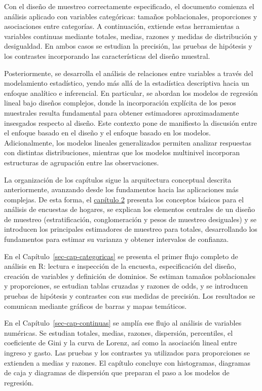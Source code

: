 \documentclass[
  spanish,
  11pt,
  letterpaper,
  oneside,
  open=any]{scrbook}
\begin{document}
Con el diseño de muestreo correctamente especificado, el documento
comienza el análisis aplicado con variables categóricas: tamaños
poblacionales, proporciones y asociaciones entre categorías. A
continuación, extiende estas herramientas a variables continuas mediante
totales, medias, razones y medidas de distribución y desigualdad. En
ambos casos se estudian la precisión, las pruebas de hipótesis y los
contrastes incorporando las características del diseño muestral.

Posteriormente, se desarrolla el análisis de relaciones entre variables
a través del modelamiento estadístico, yendo más allá de la estadística
descriptiva hacia un enfoque analítico e inferencial. En particular, se
abordan los modelos de regresión lineal bajo diseños complejos, donde la
incorporación explícita de los pesos muestrales resulta fundamental para
obtener estimadores aproximadamente insesgados respecto al diseño. Este
contexto pone de manifiesto la discusión entre el enfoque basado en el
diseño y el enfoque basado en los modelos. Adicionalmente, los modelos
lineales generalizados permiten analizar respuestas con distintas
distribuciones, mientras que los modelos multinivel incorporan
estructuras de agrupación entre las observaciones.

La organización de los capítulos sigue la arquitectura conceptual
descrita anteriormente, avanzando desde los fundamentos hacia las
aplicaciones más complejas. De esta forma, el
\href{02-Conceptos.qmd}{capítulo 2} presenta los conceptos básicos para
el análisis de encuestas de hogares, se explican los elementos centrales
de un diseño de muestreo (estratificación, conglomeración y pesos de
muestreo desiguales) y se introducen los principales estimadores de
muestreo para totales, desarrollando los fundamentos para estimar su
varianza y obtener intervalos de confianza.

En el Capítulo~\ref{sec-cap-categoricas} se presenta el primer flujo
completo de análisis en R: lectura e inspección de la encuesta,
especificación del diseño, creación de variables y definición de
dominios. Se estiman tamaños poblacionales y proporciones, se estudian
tablas cruzadas y razones de odds, y se introducen pruebas de hipótesis
y contrastes con sus medidas de precisión. Los resultados se comunican
mediante gráficos de barras y mapas temáticos.

En el Capítulo~\ref{sec-cap-continuas} se amplía ese flujo al análisis
de variables numéricas. Se estudian totales, medias, razones,
dispersión, percentiles, el coeficiente de Gini y la curva de Lorenz,
así como la asociación lineal entre ingreso y gasto. Las pruebas y los
contrastes ya utilizados para proporciones se extienden a medias y
razones. El capítulo concluye con histogramas, diagramas de caja y
diagramas de dispersión que preparan el paso a los modelos de regresión.
\end{document}
